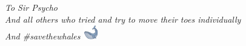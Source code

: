 \thispagestyle{plain}

\begin{flushright}
    \Large\em\null\vskip5cm To Sir Psycho \\
    \large And all others who tried and try to move their toes individually\\
    \large And \#savethewhales \includegraphics{../plots/emojis/1F40B.pdf}
\end{flushright}

